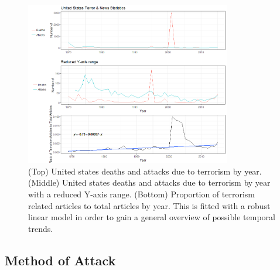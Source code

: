 \documentclass[10pt,a4paper]{article}
\begin{document}
\begin{center}
\begin{figure}[H]
	\includegraphics[width=0.8\textwidth]{Plots/NewsData/AttackNewsData.png}
	\caption{(Top) United states deaths and attacks due to terrorism by year. 
	(Middle) United states deaths and attacks due to terrorism by year with a reduced Y-axis range. 
	(Bottom) Proportion of terrorism related articles to total articles by year. This is fitted with a robust linear model in order to gain a general overview of possible temporal trends.}
\end{figure}
\end{center}

\subsection{Method of Attack}
\end{document}
